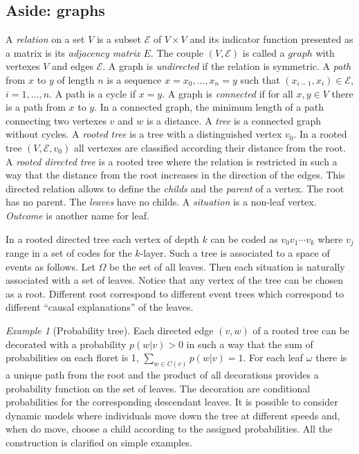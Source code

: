 \documentclass[12pt,a4paper]{amsart}
\theoremstyle{plain}%
\theoremstyle{definition}
\theoremstyle{remark}
\newtheorem{example}{Example}
\begin{document}
\subsection{Aside: graphs}
A \emph{relation} on a set $V$ is a subset $\mathcal E$ of $V \times V$ and its indicator function presented as a matrix is its \emph{adjacency matrix} $E$. The couple $(V,\mathcal E)$ is called a $graph$ with vertexes $V$ and edges $\mathcal E$. A graph is \emph{undirected} if the relation is symmetric. A \emph{path} from $x$ to $y$ of length $n$ is a sequence $x = x_0,\dots,x_n=y$ such that $(x_{i-1},x_i) \in \mathcal E$, $i =1,\dots,n$. A path is a cycle if $x=y$. A graph is \emph{connected} if for all $x,y \in V$ there is a path from $x$ to $y$. In a connected graph, the minimum length of a path connecting two vertexes $v$ and $w$ is a distance. A \emph{tree} is a connected graph without cycles. A \emph{rooted tree} is a tree with a distinguished vertex $v_0$. In a rooted tree $(V,\mathcal E,v_0)$ all vertexes are classified according their distance from the root. A \emph{rooted directed tree} is a rooted tree where the relation is restricted in such a way that the distance from the root increases in the direction of the edges. This directed relation allows to define the \emph{childs} and the \emph{parent} of a vertex. The root has no parent. The \emph{leaves} have no childs. A \emph{situation} is a non-leaf vertex. \emph{Outcome} is another name for leaf.

In a rooted directed tree each vertex of depth $k$ can be coded as $v_0v_1\cdots v_k$ where $v_j$ range in a set of codes for the $k$-layer. Such a tree is associated to a space of events as follows. Let $\Omega$ be the set of all leaves. Then each situation is naturally associated with a set of leaves. Notice that any vertex of the tree can be chosen as a root. Different root correspond to different event trees which correspond to different ``causal explanations'' of the leaves.   

\begin{example}[Probability tree]
Each directed edge $(v,w)$ of a rooted tree can be decorated with a probability $p(w|v) > 0$ in such a way that the sum of probabilities on each floret is 1, $\sum_{w \in C(v)} p(w|v) = 1$. For each leaf $\omega$ there is a unique path from the root and the product of all decorations provides a probability function on the set of leaves. The decoration are conditional probabilities for the corresponding descendant leaves. It is possible to consider dynamic models where individuals move down the tree at different speeds and, when do move, choose a child according to the assigned probabilities. All the construction is clarified on simple examples.
\end{example}
\end{document}
